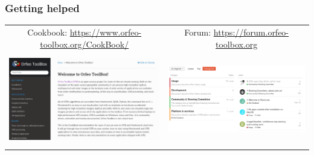 \documentclass[8pt,aspectratio=169]{beamer}
\begin{document}
      \begin{frame}
        \frametitle{Getting helped}
        \begin{center}
        \begin{small}
          \vspace{0.2cm}
        \hspace*{-13mm}\begin{tabular}{cc}
        Cookbook: \url{https://www.orfeo-toolbox.org/CookBook/} & Forum: \url{https://forum.orfeo-toolbox.org}\\
          \includegraphics[height=4cm]{cookbook.png} & \includegraphics[height=4cm]{discourse.png}\\
      \end{tabular}
        \end{small}
      \end{center}
    \end{frame}
\end{document}
